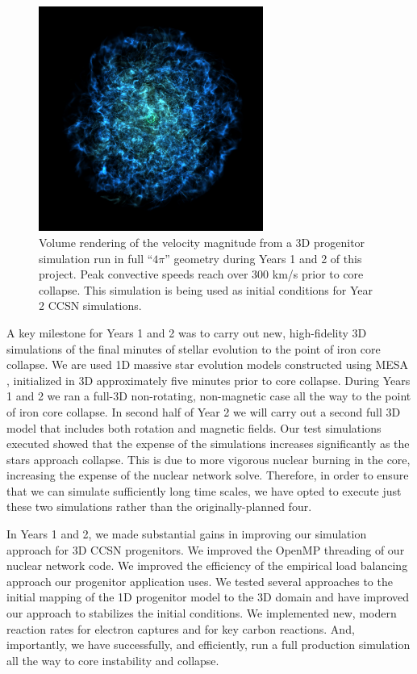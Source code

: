 \documentclass[12pt]{article}
\begin{document}
\begin{figure}
  \includegraphics[width=2.9in]{mag_vel_face_on_no_rot_prog3d_oct_vol_0834.jpg}
  \caption{Volume rendering of the velocity magnitude from a 3D progenitor simulation run in full ``$4\pi$'' geometry during Years 1 and 2 of this project. Peak convective speeds reach over 300 km/s prior to core collapse. This simulation is being used as initial conditions for Year 2 CCSN simulations.}
  \label{f.progen}
\end{figure}
A key milestone for Years 1 and 2 was to carry out new, high-fidelity 3D simulations of the final minutes of stellar evolution to the point of iron core collapse.
We are used 1D massive star evolution models constructed using MESA \citep{paxton:2011, paxton:2013, paxton:2015}, initialized in 3D approximately five minutes prior to core collapse.
During Years 1 and 2 we ran a full-3D non-rotating, non-magnetic case all the way to the point of iron core collapse. 
In second half of Year 2 we will carry out a second full 3D model that includes both rotation and magnetic fields.
Our test simulations executed showed that the expense of the simulations increases significantly as the stars approach collapse.
This is due to more vigorous nuclear burning in the core, increasing the expense of the nuclear network solve.
Therefore, in order to ensure that we can simulate sufficiently long time scales, we have opted to execute just these two simulations rather than the originally-planned four.


In Years 1 and 2, we made substantial gains in improving our simulation approach for 3D CCSN progenitors.
We improved the OpenMP threading of our nuclear network code. 
We improved the efficiency of the empirical load balancing approach our progenitor application uses. 
We tested several approaches to the initial mapping of the 1D progenitor model to the 3D domain and have improved our approach to stabilizes the initial conditions. 
We implemented new, modern reaction rates for electron captures and for key carbon reactions.
And, importantly, we have successfully, and efficiently, run a full production simulation all the way to core instability and collapse.
\end{document}
